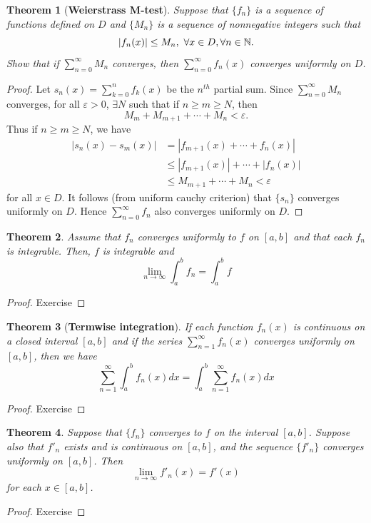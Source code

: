 \documentclass[	DIV=calc,paper=a4,fontsize=11pt]{scrartcl}	 	%
\newtheorem{thm}{Theorem}[section]
\theoremstyle{definition}
\theoremstyle{plain}
\theoremstyle{remark}
\begin{document}
\begin{thm}[\textbf{Weierstrass M-test}]
Suppose that $\{f_n\}$ is a sequence of functions defined on $D$ and $\{M_n\}$ is a sequence of nonnegative integers such that
$$|f_n(x)| \leq M_n,\ \forall x \in D, \forall n\in\Bbb N.$$
Show that if $\sum_{n=0}^{\infty} M_n$ converges, then $\sum_{n=0}^{\infty}f_n(x)$ converges uniformly on $D$.
\end{thm}
\begin{proof}
Let $s_n(x) =\sum_{k=0}^{n}f_k(x)$ be the $n^{th}$ partial sum. Since $\sum_{n=0}^{\infty}M_n$
converges, for all $\varepsilon > 0$, $\exists N$ such that if $n\ge m \ge N$, then
\[M_m+ M_{m+1} +\cdots + M_n < \varepsilon.\]
Thus if $n \ge m \ge N$, we have
\begin{align*}
|s_n(x) - s_m(x)| &= |f_{m+1}(x) + \cdots + f_n(x)|\\
                  &\le |f_{m+1}(x)| +\cdots + |f_n(x)|\\
                  &\le M_{m+1} +\cdots + M_n < \varepsilon
\end{align*}
for all $x\in D$. It follows (from uniform cauchy criterion) that $\{s_n\}$ converges uniformly on $D$. Hence $\sum_{n=0}^{\infty}f_n$ also converges uniformly on $D$.
\end{proof}

\begin{thm}
Assume that $f_n$ converges uniformly to $f$ on $[a, b]$ and that each $f_n$ is integrable. Then, $f$ is integrable
and
\[\lim_{n\to\infty}\int_a^b f_n=\int_a^b f\]
\end{thm}
\begin{proof}
Exercise
\end{proof}

\begin{thm}[\textbf{Termwise integration}]
If each function $f_n(x)$ is continuous on a closed interval $[a, b]$ and if the series $\sum_{n=1}^{\infty}f_n(x)$ converges uniformly on $[a, b]$, then we have
\[\sum_{n=1}^{\infty}\int_a^b f_n(x)dx =\int_a^b\sum_{n=1}^{\infty}f_n(x)dx\]
\end{thm}
\begin{proof}
Exercise
\end{proof}

\begin{thm}
Suppose that $\{f_n\}$ converges to $f$ on the interval $[a, b]$. Suppose also that $f'_n$ exists and is
continuous on $[a, b]$, and the sequence $\{f'_n\}$ converges uniformly on $[a, b]$. Then
\[\lim_{n\to\infty} f'_n(x) = f'(x)\]
for each $x\in [a, b]$.
\end{thm}
\begin{proof}
Exercise
\end{proof}
\end{document}
